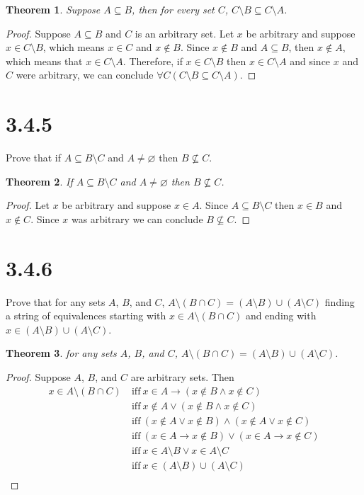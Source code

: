 \documentclass{article}
\newtheorem*{theorem}{Theorem}  %
\begin{document}
\begin{theorem} Suppose $A \subseteq B$, then for every set $C$, $C \setminus B \subseteq C \setminus A$.
\end{theorem}
\begin{proof}
Suppose $A \subseteq B$ and $C$ is an arbitrary set. Let $x$ be arbitrary and suppose $x \in C \setminus B$, which means $x \in C$ and $x \notin B$. Since $x \notin B$ and $A \subseteq B$, then $x \notin A$, which means that $x \in C \setminus A$. Therefore, if $x \in C \setminus B$ then $x \in C \setminus A$ and since $x$ and $C$ were arbitrary, we can conclude $\forall C (C \setminus B \subseteq C \setminus A).$
\end{proof}

\section*{3.4.5}
Prove that if $A \subseteq B \setminus C$ and $A \neq \varnothing$ then $B \not\subseteq C$.

\begin{theorem} If $A \subseteq B \setminus C$ and $A \neq \varnothing$ then $B \not\subseteq C$.
\end{theorem}
\begin{proof}
Let $x$ be arbitrary and suppose $x \in A$. Since $A \subseteq B \setminus C$ then $x \in B$ and $x \notin C$. Since $x$ was arbitrary we can conclude $B \not\subseteq C$.
\end{proof}

\section*{3.4.6}
Prove that for any sets $A$, $B$, and $C$, $A \setminus(B \cap C) = (A \setminus B) \cup (A \setminus C)$ finding a string of equivalences starting with $x \in A \setminus (B \cap C)$ and ending with $x \in (A \setminus B) \cup (A \setminus C)$.

\begin{theorem} for any sets $A$, $B$, and $C$, $A \setminus(B \cap C) = (A \setminus B) \cup (A \setminus C)$.
\end{theorem}
\begin{proof}
Suppose $A$, $B$, and $C$ are arbitrary sets. Then
\begin{align*}
x \in A \setminus (B \cap C) ~ &\text{iff} ~ x \in A \rightarrow (x \notin B \land x \notin C) \\
&\text{iff} ~ x \notin A \lor (x \notin B \land x \notin C) \\
&\text{iff} ~ (x \notin A \lor x \notin B) \land (x \notin A \lor x \notin C) \\
&\text{iff} ~ (x \in A \rightarrow x \notin B) \lor (x \in A \rightarrow x \notin C) \\
&\text{iff} ~ x \in A \setminus B \lor x \in A \setminus C \\
&\text{iff} ~ x \in (A \setminus B) \cup (A \setminus C) \\
\end{align*}

\end{proof}
\end{document}

